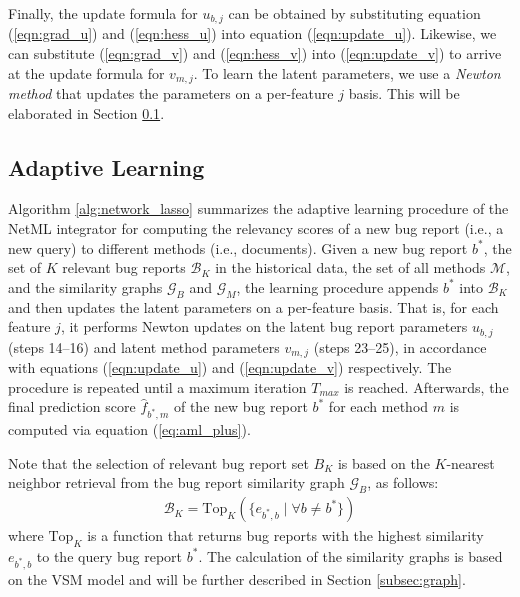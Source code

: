 
Finally, the update formula for $u_{b,j}$ can be obtained by substituting equation (\ref{eqn:grad_u}) and (\ref{eqn:hess_u}) into equation (\ref{eqn:update_u}). Likewise, we can substitute (\ref{eqn:grad_v}) and (\ref{eqn:hess_v}) into (\ref{eqn:update_v}) to arrive at the update formula for $v_{m,j}$. To learn the latent parameters, we use a \emph{Newton method} that updates the parameters on a per-feature $j$ basis. This will be elaborated in Section \ref{sec:learning}.

\subsection{Adaptive Learning}
\label{sec:learning}

Algorithm \ref{alg:network_lasso} summarizes the adaptive learning procedure of the NetML integrator for computing the relevancy scores of a new bug report (i.e., a new query) to different methods (i.e., documents). Given a new bug report $b^*$, the set of $K$ relevant bug reports $\mathcal{B}_K$ in the historical data,  the set of all methods $\mathcal{M}$, and the similarity graphs $\mathcal{G}_B$ and $\mathcal{G}_M$, the learning procedure appends $b^*$ into $\mathcal{B}_K$ and then updates the latent parameters on a per-feature basis. That is, for each feature $j$, it performs Newton updates on the latent bug report parameters $u_{b,j}$ (steps 14--16) and latent method parameters $v_{m,j}$ (steps 23--25), in accordance with equations (\ref{eqn:update_u}) and (\ref{eqn:update_v}) respectively. The procedure is repeated until a maximum iteration $T_{max}$ is reached. Afterwards, the final prediction score $\hat{f}_{b^*,m}$ of the new bug report $b^*$ for each method $m$ is computed via equation (\ref{eq:aml_plus}).

Note that the selection of relevant bug report set $B_K$ is based on the $K$-nearest neighbor retrieval from the bug report similarity graph $\mathcal{G}_B$, as follows:
\begin{align}
\mathcal{B}_K = \text{Top}_K( \{ e_{b^*, b} \mid \forall b \neq b^* \} )
\end{align}
where $\text{Top}_K$ is a function that returns bug reports with the highest similarity $e_{b^*, b}$ to the query bug report $b^*$. The calculation of the similarity graphs is based on the VSM model and will be further described in Section \ref{subsec:graph}.

